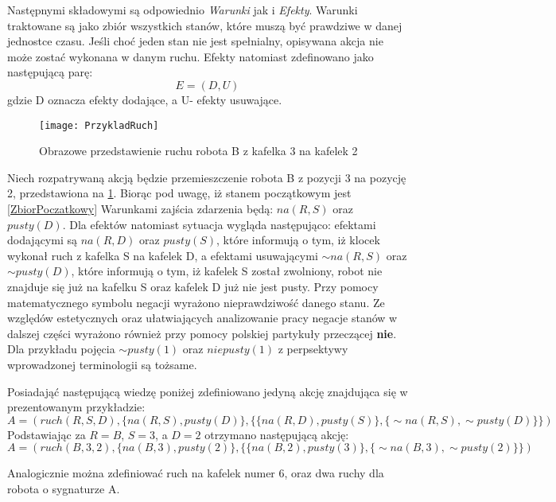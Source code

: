     Następnymi składowymi są odpowiednio \textit{Warunki} jak i \textit{Efekty}. Warunki traktowane są jako zbiór wszystkich stanów, które muszą być 
    prawdziwe w danej jednostce czasu. Jeśli choć jeden stan nie jest spełnialny, opisywana akcja nie może zostać wykonana w danym ruchu.
    Efekty natomiast zdefinowano jako następującą parę:
    \begin{equation}
        E=(D,U)
    \end{equation}
    gdzie D oznacza efekty dodające, a U- efekty usuwające.
    \begin{figure}[H]
        \texttt{[image: PrzykladRuch]}
        \centering
        \caption{Obrazowe przedstawienie ruchu robota B z kafelka 3 na kafelek 2}
        \label{PrzykladRuch}
    \end{figure}
    Niech rozpatrywaną akcją będzie przemieszczenie robota B z pozycji 3 na pozycję 2,
    przedstawiona na \ref{PrzykladRuch}. Biorąc pod uwagę, iż stanem początkowym jest \ref{ZbiorPoczatkowy} Warunkami zajścia zdarzenia
    będą: $na(R,S)$ oraz $pusty(D)$. Dla efektów natomiast sytuacja wygląda następująco: efektami dodającymi są $na(R,D)$ oraz $pusty(S)$, które informują o tym, iż klocek 
    wykonał ruch z kafelka S na kafelek D, a efektami usuwającymi $\sim na(R,S)$ oraz $\sim pusty(D)$, które informują o tym, iż kafelek S został zwolniony, 
    robot nie znajduje się już na kafelku S oraz kafelek D już nie jest pusty. 
    Przy pomocy matematycznego symbolu negacji wyrażono nieprawdziwość danego stanu. Ze względów estetycznych 
    oraz ułatwiających analizowanie pracy negacje stanów w dalszej części wyrażono również przy pomocy polskiej partykuły przeczącej \textbf{nie}. 
    Dla przykładu pojęcia $\sim pusty(1)$ oraz $niepusty(1)$ z perpsektywy wprowadzonej terminologii są tożsame. 

        Posiadająć następującą wiedzę poniżej zdefiniowano jedyną akcję znajdująca się w prezentowanym przykładzie:
    \begin{equation}
        \label{Ruch}
        A=(ruch(R,S,D),\{na(R,S),pusty(D)\},\{\{na(R,D),pusty(S)\},\{ \sim na(R,S),\sim pusty(D)\}\})
    \end{equation}
    Podstawiając za $R=B$, $S=3$, a $D=2$ otrzymano następującą akcję:
    \begin{equation}
        A=(ruch(B,3,2),\{na(B,3),pusty(2)\},\{\{na(B,2),pusty(3)\},\{ \sim na(B,3),\sim pusty(2)\}\})
    \end{equation}
    
    Analogicznie można zdefiniować ruch na kafelek numer 6, oraz dwa ruchy dla robota o sygnaturze A.


